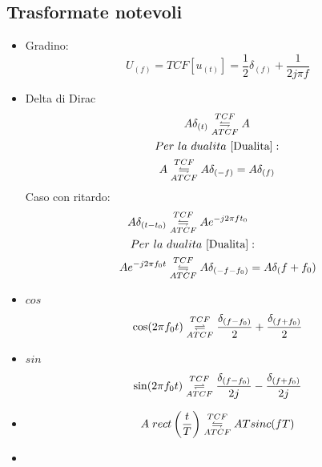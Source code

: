     \subsection{Trasformate notevoli}
        \begin{itemize}
            \item {Gradino:\\
                \[
                    U_{(f)} = TCF[u_{(t)}] = \frac{1}{2}\delta_{(f)}+\frac{1}{2j\pi f}
                \]
            }
            \item {Delta di Dirac\\
                \begin{gather}
                    A\delta_{(t)} \overunderset{TCF}{ATCF}{\leftrightharpoons} A \nonumber \\
                    Per\ la\ dualita\ \ref{Dualita}: \nonumber \\
                    A \overunderset{TCF}{ATCF}{\leftrightharpoons} A\delta_{(-f)} = A\delta_{(f)}  \nonumber 
                \end{gather}
                Caso con ritardo:
                \begin{align}
                    A\delta_{(t-t_0)} &\overunderset{TCF}{ATCF}{\leftrightharpoons} Ae^{-j2\pi ft_0} \nonumber \\
                    Per\ la\ &dualita\ \ref{Dualita}: \nonumber \\
                    Ae^{-j2\pi f_0t} &\overunderset{TCF}{ATCF}{\leftrightharpoons} A\delta_{(-f-f_0)} =  A\delta_(f+f_0) \nonumber 
                \end{align}
            }
            \item {$cos$
                \[
                    \cos(2\pi f_0t) \overunderset{TCF}{ATCF}{\rightleftharpoons} \frac{\delta_{(f-f_0)}}{2} +\frac{\delta_{(f+f_0)}}{2}
                \]
            }
            \item {$sin$
                \[
                    \sin(2\pi f_0t) \overunderset{TCF}{ATCF}{\rightleftharpoons} \frac{\delta_{(f-f_0)}}{2j} -\frac{\delta_{(f+f_0)}}{2j}
                \]
            }
            \item{
                \[
                    A\hspace{0.1cm}rect\left(\frac{t}{T}\right) \overunderset{TCF}{ATCF}{\leftrightharpoons} AT sinc(fT)
                \]
            }
            \item {
                \begin{gather}

\end{gather}}
\end{itemize}
